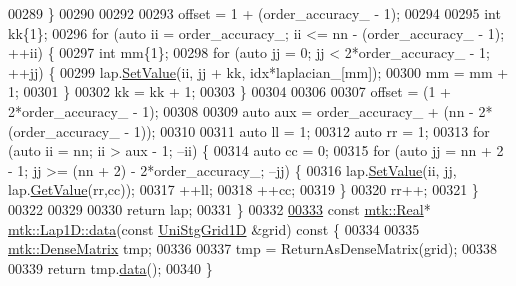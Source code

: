 \begin{DoxyCode}
00289   \}
00290 
00292 
00293   offset = 1 + (order\_accuracy\_ - 1);
00294 
00295   \textcolor{keywordtype}{int} kk\{1\};
00296   \textcolor{keywordflow}{for} (\textcolor{keyword}{auto} ii = order\_accuracy\_; ii <= nn - (order\_accuracy\_ - 1); ++ii) \{
00297     \textcolor{keywordtype}{int} mm\{1\};
00298     \textcolor{keywordflow}{for} (\textcolor{keyword}{auto} jj = 0; jj < 2*order\_accuracy\_ - 1; ++jj) \{
00299       lap.\hyperlink{classmtk_1_1DenseMatrix_a784ce5784109ac86bfb9d8562b334b13}{SetValue}(ii, jj + kk, idx*laplacian\_[mm]);
00300       mm = mm + 1;
00301     \}
00302     kk = kk + 1;
00303   \}
00304 
00306 
00307   offset = (1 + 2*order\_accuracy\_ - 1);
00308 
00309   \textcolor{keyword}{auto} aux = order\_accuracy\_ + (nn - 2*(order\_accuracy\_ - 1));
00310 
00311   \textcolor{keyword}{auto} ll = 1;
00312   \textcolor{keyword}{auto} rr = 1;
00313   \textcolor{keywordflow}{for} (\textcolor{keyword}{auto} ii = nn; ii > aux - 1; --ii) \{
00314     \textcolor{keyword}{auto} cc = 0;
00315     \textcolor{keywordflow}{for} (\textcolor{keyword}{auto} jj = nn + 2 - 1; jj >= (nn + 2) - 2*order\_accuracy\_; --jj) \{
00316       lap.\hyperlink{classmtk_1_1DenseMatrix_a784ce5784109ac86bfb9d8562b334b13}{SetValue}(ii, jj, lap.\hyperlink{classmtk_1_1DenseMatrix_a4b23ecbebd970b5eea915dbb50691024}{GetValue}(rr,cc));
00317       ++ll;
00318       ++cc;
00319     \}
00320     rr++;
00321   \}
00322 
00329 
00330   \textcolor{keywordflow}{return} lap;
00331 \}
00332 
\hypertarget{mtk__lap__1d_8cc_source_l00333}{}\hyperlink{classmtk_1_1Lap1D_ab2652725a8407c79247680c7bbd073b8}{00333} \textcolor{keyword}{const} \hyperlink{group__c01-roots_gac080bbbf5cbb5502c9f00405f894857d}{mtk::Real}* \hyperlink{classmtk_1_1Lap1D_ab2652725a8407c79247680c7bbd073b8}{mtk::Lap1D::data}(\textcolor{keyword}{const} \hyperlink{classmtk_1_1UniStgGrid1D}{UniStgGrid1D} &grid)\textcolor{keyword}{ const }\{
00334 
00335   \hyperlink{classmtk_1_1DenseMatrix}{mtk::DenseMatrix} tmp;
00336 
00337   tmp = ReturnAsDenseMatrix(grid);
00338 
00339   \textcolor{keywordflow}{return} tmp.\hyperlink{classmtk_1_1DenseMatrix_a0c33b8a9e01d157c61ddbdf807c25d84}{data}();
00340 \}
\end{DoxyCode}
